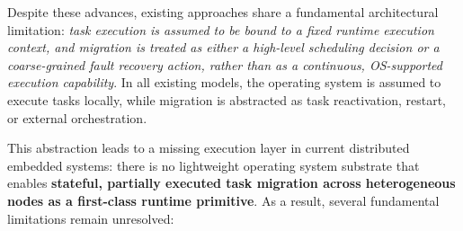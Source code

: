 Despite these advances, existing approaches share a fundamental architectural limitation:
\textit{task execution is assumed to be bound to a fixed runtime execution context, and
	migration is treated as either a high-level scheduling decision or a coarse-grained fault
	recovery action, rather than as a continuous, OS-supported execution capability}. In all
existing models, the operating system is assumed to execute tasks locally, while migration
is abstracted as task reactivation, restart, or external orchestration.

This abstraction leads to a missing execution layer in current distributed embedded systems:
there is no lightweight operating system substrate that enables \textbf{stateful, partially
	executed task migration across heterogeneous nodes as a first-class runtime primitive}.
As a result, several fundamental limitations remain unresolved:


